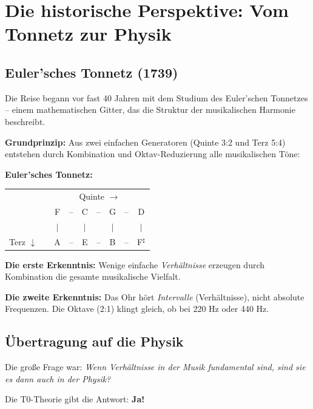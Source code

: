 \section{Die historische Perspektive: Vom Tonnetz zur Physik}

\subsection{Euler'sches Tonnetz (1739)}

Die Reise begann vor fast 40 Jahren mit dem Studium des Euler'schen Tonnetzes -- einem mathematischen Gitter, das die Struktur der musikalischen Harmonie beschreibt.

\textbf{Grundprinzip:} Aus zwei einfachen Generatoren (Quinte 3:2 und Terz 5:4) entstehen durch Kombination und Oktav-Reduzierung alle musikalischen Töne:

\textbf{Euler'sches Tonnetz:}

\begin{center}
	\begin{small}
		\begin{tabular}{ccccccccc}
			& & \multicolumn{7}{c}{Quinte $\rightarrow$} \\
			& & F & -- & C & -- & G & -- & D \\
			& & $\vert$ & & $\vert$ & & $\vert$ & & $\vert$ \\
			Terz $\downarrow$ & & A & -- & E & -- & B & -- & F$^\sharp$ \\
		\end{tabular}
	\end{small}
\end{center}

\textbf{Die erste Erkenntnis:} Wenige einfache \textit{Verhältnisse} erzeugen durch Kombination die gesamte musikalische Vielfalt.

\textbf{Die zweite Erkenntnis:} Das Ohr hört \textit{Intervalle} (Verhältnisse), nicht absolute Frequenzen. Die Oktave (2:1) klingt gleich, ob bei 220 Hz oder 440 Hz.

\subsection{Übertragung auf die Physik}

Die große Frage war: \textit{Wenn Verhältnisse in der Musik fundamental sind, sind sie es dann auch in der Physik?}

Die T0-Theorie gibt die Antwort: \textbf{Ja!}

